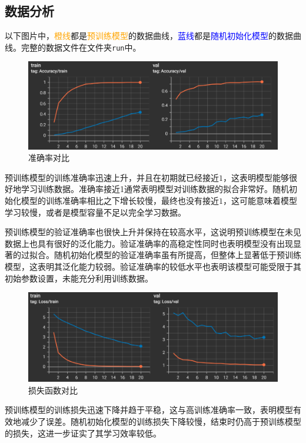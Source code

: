 \documentclass[notitlepage,cs4size,punct,oneside]{ctexrep}
\numberwithin{equation}{chapter}
\theoremstyle{mystyle}
\begin{document}
\subsection{数据分析}
以下图片中，\textcolor{orange}{橙线}都是\textcolor{orange}{预训练模型}的数据曲线，\textcolor{blue}{蓝线}都是\textcolor{blue}{随机初始化模型}的数据曲线。完整的数据文件在文件夹\texttt{run}中。

\begin{figure}[H]
    \centering
    \includegraphics[scale=0.75]{acc.png}
    \caption{准确率对比}
    \label{fig:acc}
\end{figure}

预训练模型的训练准确率迅速上升，并且在初期就已经接近$1$，这表明模型能够很好地学习训练数据。准确率接近1通常表明模型对训练数据的拟合非常好。随机初始化模型的训练准确率相比之下增长较慢，最终也没有接近$1$，这可能意味着模型学习较慢，或者是模型容量不足以完全学习数据。

预训练模型的验证准确率也很快上升并保持在较高水平，这说明预训练模型在未见数据上也具有很好的泛化能力。验证准确率的高稳定性同时也表明模型没有出现显著的过拟合。随机初始化模型的验证准确率虽有所提高，但整体上显著低于预训练模型，这表明其泛化能力较弱。验证准确率的较低水平也表明该模型可能受限于其初始参数设置，未能充分利用训练数据。


\begin{figure}[H]
    \centering
    \includegraphics[scale=0.75]{loss.png}
    \caption{损失函数对比}
    \label{fig:loss}
\end{figure}

预训练模型的训练损失迅速下降并趋于平稳，这与高训练准确率一致，表明模型有效地减少了误差。随机初始化模型的训练损失下降较慢，结束时仍高于预训练模型的损失，这进一步证实了其学习效率较低。
\end{document}
